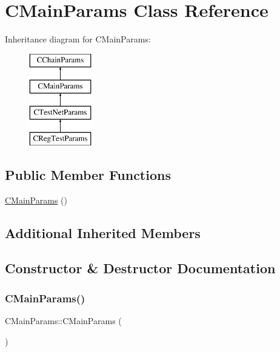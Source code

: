\hypertarget{class_c_main_params}{}\section{C\+Main\+Params Class Reference}
\label{class_c_main_params}
Inheritance diagram for C\+Main\+Params\+:\begin{figure}[H]
\begin{center}
\leavevmode
\includegraphics[height=4.000000cm]{class_c_main_params}
\end{center}
\end{figure}
\subsection*{Public Member Functions}
\begin{DoxyCompactItemize}
\item 
\mbox{\hyperlink{class_c_main_params_ab7dfebf3c4dd5cc0ebdfabe1111056d6}{C\+Main\+Params}} ()
\end{DoxyCompactItemize}
\subsection*{Additional Inherited Members}


\subsection{Constructor \& Destructor Documentation}
\mbox{\label{class_c_main_params_ab7dfebf3c4dd5cc0ebdfabe1111056d6}} 
\subsubsection{\texorpdfstring{C\+Main\+Params()}{CMainParams()}}
{\footnotesize\ttfamily C\+Main\+Params\+::\+C\+Main\+Params (\begin{DoxyParamCaption}{ }\end{DoxyParamCaption})\hspace{0.3cm}{\ttfamily [inline]}}

